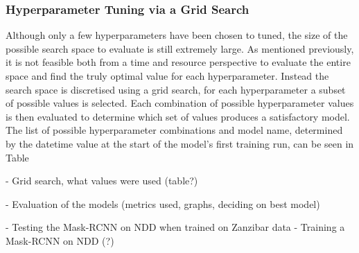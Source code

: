 \subsubsection{Hyperparameter Tuning via a Grid Search}\label{ch:cetDet,sec:initialTesting,sub:hyperparameters,subsub:GridSearch}

Although only a few hyperparameters have been chosen to tuned, the size of the possible search space to evaluate is still extremely large. As mentioned previously, it is not feasible both from a time and resource perspective to evaluate the entire space and find the truly optimal value for each hyperparameter. Instead the search space is discretised using a grid search, for each hyperparameter a subset of possible values is selected. Each combination of possible hyperparameter values is then evaluated to determine which set of values produces a satisfactory model. The list of possible hyperparameter combinations and model name, determined by the datetime value at the start of the model's first training run, can be seen in Table 















- Grid search, what values were used (table?)

- Evaluation of the models (metrics used, graphs, deciding on best model)

- Testing the Mask-RCNN on NDD when trained on Zanzibar data
- Training a Mask-RCNN on NDD (?)

